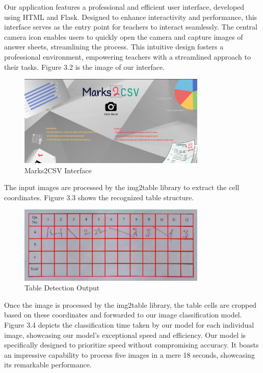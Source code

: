 Our application features a professional and efficient user interface, developed using HTML and Flask. Designed to enhance interactivity and performance, this interface serves as the entry point for teachers to interact seamlessly. The central camera icon enables users to quickly open the camera and capture images of answer sheets, streamlining the process. This intuitive design fosters a professional environment, empowering teachers with a streamlined approach to their tasks. Figure 3.2 is the image of our interface.

\begin{figure}[h!]
    \centering
    \includegraphics[width=0.8\textwidth]{Images/results/interface.png}
    \caption{Marks2CSV Interface}
\end{figure}

\noindent The input images are processed by the img2table library to extract the cell coordinates. Figure 3.3 shows the recognized table structure.

\begin{figure}[h!]
    \centering
    \includegraphics[width=0.8\textwidth]{Images/results/Img_with_redlines.jpg}
    \caption{Table Detection Output}
\end{figure}

\clearpage

\noindent Once the image is processed by the img2table library, the table cells are cropped based on these coordinates and forwarded to our image classification model. Figure 3.4 depicts the classification time taken by our model for each individual image, showcasing our model's exceptional speed and efficiency. Our model is specifically designed to prioritize speed without compromising accuracy. It boasts an impressive capability to process five images in a mere 18 seconds, showcasing its remarkable performance.

